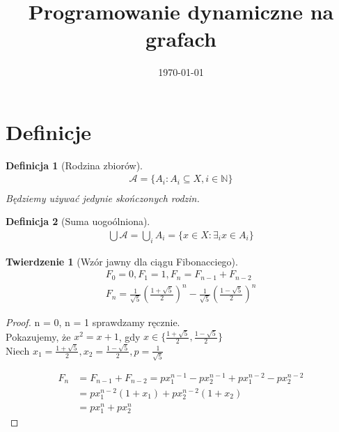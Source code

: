 \documentclass[paper=a4, fontsize=11pt]{article}
\title{	
\huge Programowanie dynamiczne na grafach
}
\date{\normalsize\today}
\begin{document}
\maketitle

\newtheorem{mydef}{Definicja}
\newtheorem{theorem}{Twierdzenie}
\newtheorem{lemma}{Lemat}

\section{Definicje}
\begin{mydef}[Rodzina zbiorów]
\begin{gather*}
\mathcal{A} = \{ A_i : A_i \subseteq X, i \in \mathbb{N} \} \\
\end{gather*}
Będziemy używać jedynie skończonych rodzin.
\end{mydef}
\begin{mydef}[Suma uogoólniona] 
\begin{gather*}
\bigcup \mathcal{A} = \bigcup_i A_i = \{ x \in X : \exists_i x \in A_i \}
\end{gather*}
\end{mydef}

\begin{theorem}[Wzór jawny dla ciągu Fibonacciego]
\begin{gather*}
F_0 = 0, F_1 = 1, F_n = F_{n-1} + F_{n-2} \\
F_n = \frac{1}{\sqrt{5}}(\frac{1 + \sqrt{5}}{2})^n - \frac{1}{\sqrt{5}}(\frac{1 - \sqrt{5}}{2})^n
\end{gather*}
\end{theorem}
\begin{proof}
n = 0, n = 1 sprawdzamy ręcznie. \\
Pokazujemy, że $x^2 = x + 1$, gdy $x \in \{\frac{1 + \sqrt{5}}{2}, \frac{1 - \sqrt{5}}{2}\}$ \\
Niech $x_1 = \frac{1 + \sqrt{5}}{2}, x_2 = \frac{1 - \sqrt{5}}{2}, p = \frac{1}{\sqrt{5}}$

\begin{equation*}
\begin{split}
F_n &= F_{n-1} + F_{n-2} = px_1^{n-1} - px_2^{n-1} + px_1^{n-2} - px_2^{n-2} \\
&= px_1^{n-2}(1 + x_1) + px_2^{n-2}(1 + x_2) \\
&= px_1^n + px_2^n
\end{split}
\end{equation*}
\end{proof}
\end{document}
